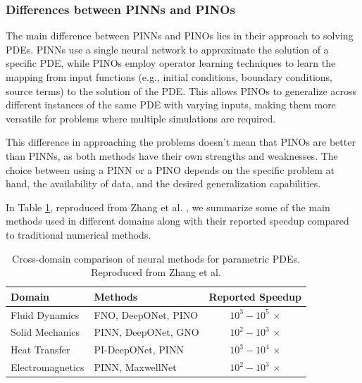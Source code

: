 \documentclass[final,1p,times]{elsarticle}
\theoremstyle{definition}
\begin{document}
\subsubsection{Differences between PINNs and PINOs}

The main difference between PINNs and PINOs lies in their approach to solving PDEs. PINNs use a single neural network to approximate the solution of a specific PDE, while PINOs employ operator learning techniques to learn the mapping from input functions (e.g., initial conditions, boundary conditions, source terms) to the solution of the PDE. This allows PINOs to generalize across different instances of the same PDE with varying inputs, making them more versatile for problems where multiple simulations are required.

This difference in approaching the problems doesn't mean that PINOs are better than PINNs, as both methods have their own strengths and weaknesses. The choice between using a PINN or a PINO depends on the specific problem at hand, the availability of data, and the desired generalization capabilities.

In Table \ref{tab:methods_comparison}, reproduced from Zhang et al. \cite{zhang2025physicsinformedneuralnetworksneural}, we summarize some of the main methods used in different domains along with their reported speedup compared to traditional numerical methods.

\begin{table}[ht]
    \centering
    \begin{tabular}{l l c}
    \hline
    \textbf{Domain} & \textbf{Methods} & \textbf{Reported Speedup} \\ 
    \hline
    Fluid Dynamics & FNO, DeepONet, PINO & $10^{3}-10^{5}$ $\times$ \\ 
    
    Solid Mechanics & PINN, DeepONet, GNO & $10^{2}-10^{3}$ $\times$ \\ 
    
    Heat Transfer & PI-DeepONet, PINN & $10^{3}-10^{4}$ $\times$ \\ 
    
    Electromagnetics & PINN, MaxwellNet & $10^{2}-10^{3}$ $\times$ \\ 
    \hline
    \end{tabular}
    \caption{Cross-domain comparison of neural methods for parametric PDEs. Reproduced from Zhang et al. \cite{zhang2025physicsinformedneuralnetworksneural}}\label{tab:methods_comparison}
\end{table}
\end{document}
